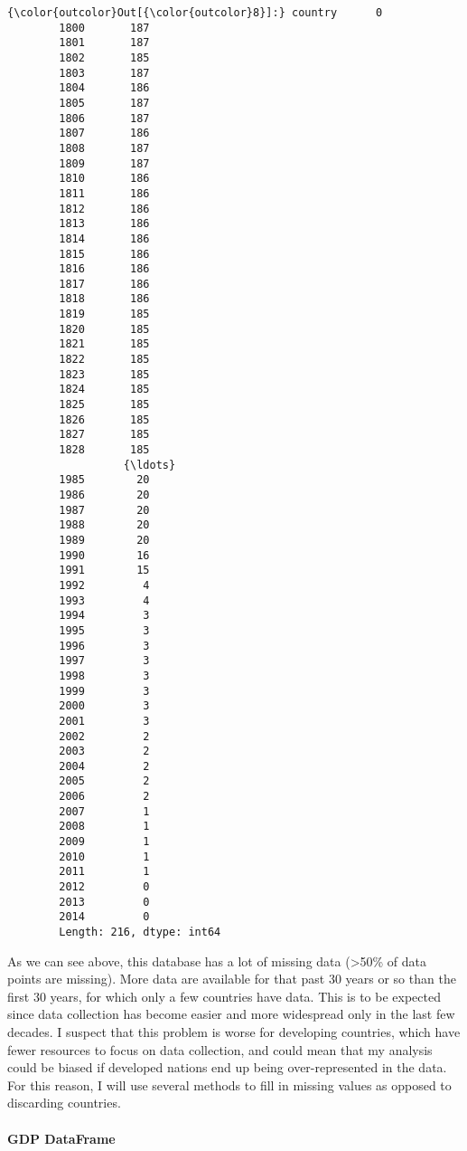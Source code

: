\documentclass[11pt]{article}
\begin{document}
\begin{Verbatim}[commandchars=\\\{\}]
{\color{outcolor}Out[{\color{outcolor}8}]:} country      0
        1800       187
        1801       187
        1802       185
        1803       187
        1804       186
        1805       187
        1806       187
        1807       186
        1808       187
        1809       187
        1810       186
        1811       186
        1812       186
        1813       186
        1814       186
        1815       186
        1816       186
        1817       186
        1818       186
        1819       185
        1820       185
        1821       185
        1822       185
        1823       185
        1824       185
        1825       185
        1826       185
        1827       185
        1828       185
                  {\ldots} 
        1985        20
        1986        20
        1987        20
        1988        20
        1989        20
        1990        16
        1991        15
        1992         4
        1993         4
        1994         3
        1995         3
        1996         3
        1997         3
        1998         3
        1999         3
        2000         3
        2001         3
        2002         2
        2003         2
        2004         2
        2005         2
        2006         2
        2007         1
        2008         1
        2009         1
        2010         1
        2011         1
        2012         0
        2013         0
        2014         0
        Length: 216, dtype: int64
\end{Verbatim}
            
    As we can see above, this database has a lot of missing data
(\textgreater{}50\% of data points are missing). More data are available
for that past 30 years or so than the first 30 years, for which only a
few countries have data. This is to be expected since data collection
has become easier and more widespread only in the last few decades. I
suspect that this problem is worse for developing countries, which have
fewer resources to focus on data collection, and could mean that my
analysis could be biased if developed nations end up being
over-represented in the data. For this reason, I will use several
methods to fill in missing values as opposed to discarding countries.

    \hypertarget{gdp-dataframe}{%
\paragraph{GDP DataFrame}\label{gdp-dataframe}}
\end{document}
